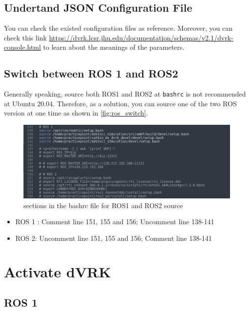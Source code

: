 \subsection{Undertand JSON Configuration File}

You can check the existed configuration files as reference. Moreover, you can check this link \url{https://dvrk.lcsr.jhu.edu/documentation/schemas/v2.1/dvrk-console.html} to learn about the meanings of the parameters.

\subsection{Switch between ROS 1 and ROS2}

Generally speaking, source both ROS1 and ROS2 at \texttt{bashrc} is not recommended at Ubuntu 20.04. Therefore, as a solution, you can source one of the two ROS version at one time as shown in \autoref{fig:ros_switch}.

\begin{figure}[H]
    \centering
    \includegraphics[width=0.9\linewidth]{figures/ROS_switch_bash.jpg}
    \caption{sections in the bashrc file for ROS1 and ROS2 source}
    \label{fig:ros_switch}
\end{figure}

\begin{itemize}
    \item ROS 1 : Comment line 151, 155 and 156; Uncomment line 138-141
    \item ROS 2: Uncomment line 151, 155 and 156; Comment line 138-141
\end{itemize}

\section{Activate dVRK}

\subsection{ROS 1}

